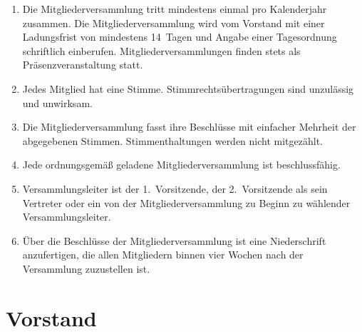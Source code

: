 \documentclass[a4paper, 10pt, headings=normal]{scrartcl}
\begin{document}
\begin{multicols}{2}
\begin{enumerate}[label={(\arabic*)}]
	\item
		Die Mitgliederversammlung tritt mindestens einmal pro Kalenderjahr zusammen.
		Die Mitgliederversammlung wird vom Vorstand mit einer Ladungsfrist von mindestens 14~Tagen und Angabe einer Tagesordnung schriftlich einberufen.
		Mitgliederversammlungen finden stets als Präsenzveranstaltung statt.
	\item
		Jedes Mitglied hat eine Stimme.
		Stimmrechtsübertragungen sind unzulässig und unwirksam.
	\item
		Die Mitgliederversammlung fasst ihre Beschlüsse mit einfacher Mehrheit der abgegebenen Stimmen.
		Stimmenthaltungen werden nicht mitgezählt.
	\item
		Jede ordnungsgemäß geladene Mitgliederversammlung ist beschlussfähig.
	\item
		Versammlungsleiter ist der 1.~Vorsitzende, der 2.~Vorsitzende als sein Vertreter oder ein von der Mitgliederversammlung zu Beginn zu wählender Versammlungsleiter.
	\item
		Über die Beschlüsse der Mitgliederversammlung ist eine Niederschrift anzufertigen, die allen Mitgliedern binnen vier Wochen nach der Versammlung zuzustellen ist.
\end{enumerate}

\section{Vorstand}
\label{par:vorstand}


\end{multicols}
\end{document}
